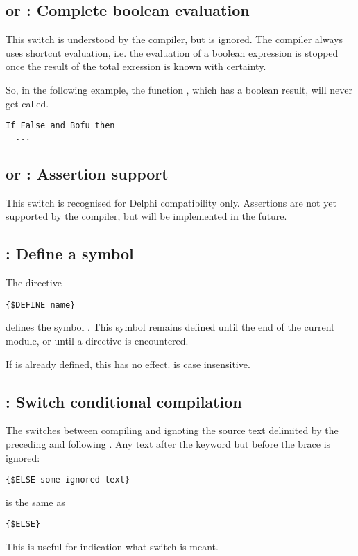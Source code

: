 \documentclass{report}
\begin{document}
\subsection{ or : Complete boolean evaluation}

This switch is understood by the \fpc compiler, but is ignored. The compiler
always uses shortcut evaluation, i.e. the evaluation of a boolean expression
is stopped once the result of the total exression is known with certainty.

So, in the following example, the function , which has a boolean
result, will never get called.
\begin{verbatim}
If False and Bofu then
  ...
\end{verbatim}

\subsection{ or  : Assertion support}

This switch is recognised for Delphi compatibility only. Assertions are not
yet supported by the compiler, but will be implemented in the future.

\subsection{ : Define a symbol}

The directive
\begin{verbatim}
{$DEFINE name}
\end{verbatim}
defines the symbol . This symbol remains defined until the end of
the current module, or until a  directive is encountered.

If  is already defined, this has no effect.  is case
insensitive.


\subsection{ : Switch conditional compilation}

The  switches between compiling and ignoting the source
text delimited by the preceding  and following 
. Any text after the  keyword but before the 
brace is ignored: 
\begin{verbatim}
{$ELSE some ignored text}
\end{verbatim}
is the same as
\begin{verbatim}
{$ELSE}
\end{verbatim}
This is useful for indication what switch is meant.
\end{document}
